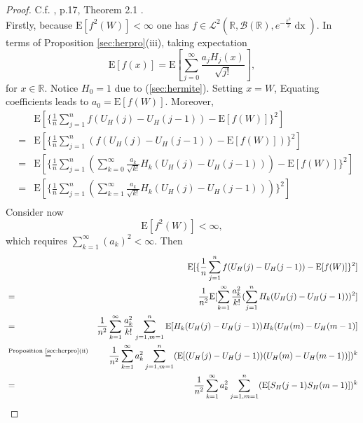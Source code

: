 \documentclass[a4paper, twoside, 11pt]{article}
\theoremstyle{definition}
\begin{document}
\begin{proof}
  C.f. \cite{nourdin}, p.17, Theorem 2.1 .\\
  Firstly, because $\mathrm{E}[f^2(W)] < \infty$ one has $f \in \mathcal{L}^2(\mathbb{R}, \mathscr{B}(\mathbb{R}), e^{-\frac{x^2}{2}}\mathop{dx})$. In terms of Proposition \ref{sec:herpro}(iii), taking expectation
  \begin{equation*}
	\mathrm{E}[f(x)] = \mathrm{E}[\sum\limits_{j=0}^{\infty} \frac{a_jH_j(x)}{\sqrt{j!}}], 
  \end{equation*}
  for $x \in \mathbb{R}$.
  Notice $H_0=1$ due to (\ref{sec:hermite}). Setting $x=W$, Equating coefficients leads to $a_0 = \mathrm{E}[f(W)]$. Moreover,
  \begin{eqnarray*}
	&& \mathrm{E}[\{\frac{1}{n}\sum\limits_{j=1}^n f(U_H(j) - U_H(j-1)) - \mathrm{E}[f(W)]\}^2]\\
	&=& \mathrm{E}[\{\frac{1}{n}\sum\limits_{j=1}^n (f(U_H(j) - U_H(j-1)) - \mathrm{E}[f(W)])\}^2] \\
	&=& \mathrm{E}[\{\frac{1}{n}\sum\limits_{j=1}^n (\sum\limits_{k=0}^\infty \frac{a_k}{\sqrt{k!}} H_k(U_H(j) - U_H(j-1))) - \mathrm{E}[f(W)]\}^2] \\
	&=& \mathrm{E}[\{\frac{1}{n}\sum\limits_{j=1}^n (\sum\limits_{k=1}^\infty \frac{a_k}{\sqrt{k!}} H_k(U_H(j) - U_H(j-1)))\}^2] \\
  \end{eqnarray*}
  Consider now 
  \begin{equation*}
	\mathrm{E}[f^2(W)] < \infty,
  \end{equation*}
  which requires $\sum\limits_{k=1}^\infty (a_k)^2 < \infty$. Then
  \begin{eqnarray*}
	&& \mathrm{E}[\{\frac{1}{n}\sum\limits_{j=1}^n f(U_H(j) - U_H(j-1)) - \mathrm{E}[f(W)]\}^2]\\
	&=& \frac{1}{n^2} \mathrm{E}[\sum\limits_{k=1}^\infty \frac{a_k^2}{k!}(\sum\limits_{j=1}^n H_k(U_H(j) - U_H(j-1)))^2] \\
	&=& \frac{1}{n^2} \sum\limits_{k=1}^\infty \frac{a_k^2}{k!}\sum\limits_{j=1, m=1}^n \mathrm{E}[H_k(U_H(j) - U_H(j-1))  H_k(U_H(m) - U_H(m-1)]\\
	&\overset{\text{Proposition \ref{sec:herpro}(ii)}}{=}&  \frac{1}{n^2} \sum\limits_{k=1}^\infty a_k^2\sum\limits_{j=1, m=1}^n (\mathrm{E}[(U_H(j) - U_H(j-1)) (U_H(m) - U_H(m-1))])^k \\
	&=& \frac{1}{n^2} \sum\limits_{k=1}^\infty a_k^2\sum\limits_{j=1, m=1}^n (\mathrm{E}[S_H(j-1) S_H(m-1)])^k\\

\end{eqnarray*}
\end{proof}
\end{document}

